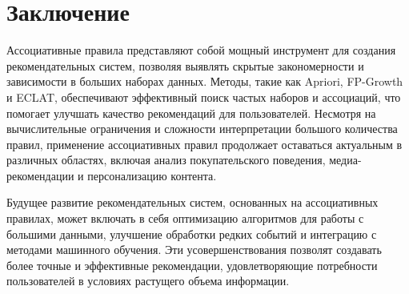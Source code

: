 \documentclass[a4paper,12pt]{article}
\begin{document}
\section{Заключение}
Ассоциативные правила представляют собой мощный инструмент для создания рекомендательных систем, позволяя выявлять скрытые закономерности и зависимости в больших наборах данных. Методы, такие как Apriori, FP-Growth и ECLAT, обеспечивают эффективный поиск частых наборов и ассоциаций, что помогает улучшать качество рекомендаций для пользователей. Несмотря на вычислительные ограничения и сложности интерпретации большого количества правил, применение ассоциативных правил продолжает оставаться актуальным в различных областях, включая анализ покупательского поведения, медиа-рекомендации и персонализацию контента.

Будущее развитие рекомендательных систем, основанных на ассоциативных правилах, может включать в себя оптимизацию алгоритмов для работы с большими данными, улучшение обработки редких событий и интеграцию с методами машинного обучения. Эти усовершенствования позволят создавать более точные и эффективные рекомендации, удовлетворяющие потребности пользователей в условиях растущего объема информации.
\end{document}
